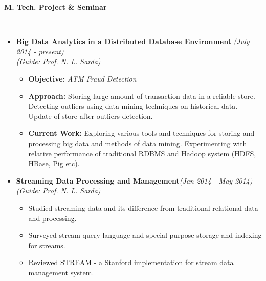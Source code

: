 \documentclass[a4paper,11pt]{article}
\newcommand{\lsep}{-0.5cm}
\newcommand{\resheading}[1]{{\small \colorbox{mygrey}{\begin{minipage}{0.975\textwidth}{\textbf{#1 \vphantom{p\^{E}}}}\end{minipage}}}}
\begin{document}
\resheading{\textbf{\large M. Tech. Project \& Seminar} }\\[\lsep]
\begin{description}
\item
\begin{itemize}

\item \textbf{Big Data Analytics in a Distributed Database Environment }\hfill \textit{(July 2014 - present)}\\
\textit{(Guide: Prof. N. L. Sarda)}
      \begin{itemize}
	  \item \textbf{Objective: }\textit{ATM Fraud Detection}
	  \item \textbf{Approach: }Storing large amount of transaction data in a reliable store. Detecting outliers using data mining techniques on historical data. Update of store after outliers detection.
	  \item \textbf{Current Work: }Exploring various tools and techniques for storing and processing big data and methods of data mining. Experimenting with relative performance of traditional RDBMS and Hadoop system (HDFS, HBase, Pig etc).
	    
 \end{itemize}
 \end{itemize}
\item
\begin{itemize}
\item \textbf{Streaming Data Processing and Management}\hfill \textit{(Jan 2014 - May 2014)}\\
\textit{(Guide: Prof. N. L. Sarda)}
      \begin{itemize}
	    \item Studied streaming data and its difference from traditional relational data and processing.
	    \item Surveyed stream query language and special purpose storage and indexing for streams.
	    \item Reviewed STREAM - a Stanford implementation for stream data management system.
      \end{itemize}
\end{itemize}

\end{description}
\end{document}
